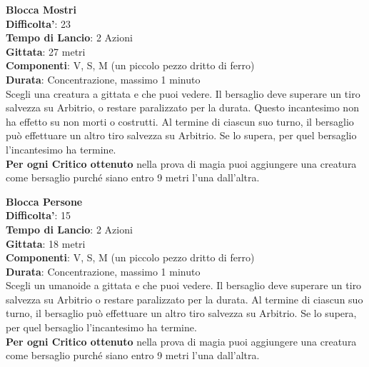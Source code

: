 \begin{multicols}{2}
\medskip\textbf{Blocca Mostri}\\
\textbf{Difficolta'}: 23\\
\textbf{Tempo di Lancio}: 2 Azioni\\
\textbf{Gittata}: 27 metri\\
\textbf{Componenti}: V, S, M (un piccolo pezzo dritto di ferro)\\
\textbf{Durata}: Concentrazione, massimo 1 minuto\\
Scegli una creatura a gittata e che puoi vedere. Il bersaglio deve superare un tiro salvezza su Arbitrio, o restare paralizzato per la durata. Questo incantesimo non ha effetto su non morti o costrutti. Al termine di ciascun suo turno, il bersaglio può effettuare un altro tiro salvezza su Arbitrio. Se lo supera, per quel bersaglio l’incantesimo ha termine.\\
\textbf{Per ogni Critico ottenuto} nella prova di magia puoi aggiungere una creatura come bersaglio purché siano entro 9 metri l’una dall’altra.


\medskip\textbf{Blocca Persone}\\
\textbf{Difficolta'}: 15\\
\textbf{Tempo di Lancio}: 2 Azioni\\
\textbf{Gittata}: 18 metri\\
\textbf{Componenti}: V, S, M (un piccolo pezzo dritto di ferro)\\
\textbf{Durata}: Concentrazione, massimo 1 minuto\\
Scegli un umanoide a gittata e che puoi vedere. Il bersaglio deve superare un tiro salvezza su Arbitrio o restare paralizzato per la durata. Al termine di ciascun suo turno, il bersaglio può effettuare un altro tiro salvezza su Arbitrio. Se lo supera, per quel bersaglio l’incantesimo ha termine.\\
\textbf{Per ogni Critico ottenuto} nella prova di magia puoi aggiungere una creatura come bersaglio purché siano entro 9 metri l’una dall’altra.



\end{multicols}
